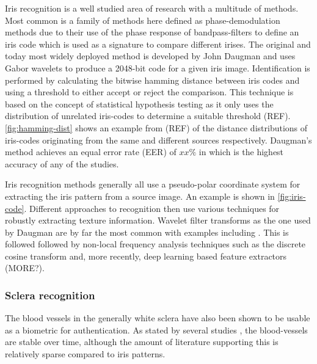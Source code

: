 Iris recognition is a well studied area of research with a multitude of methods. Most common is a family of methods here defined as phase-demodulation methods due to their use of the phase response of bandpass-filters to define an iris code which is used as a signature to compare different irises. The original and today most widely deployed method is developed by John Daugman and uses Gabor wavelets to produce a 2048-bit code for a given iris image\cite{daugmanHighConfidenceVisual1993}. Identification is performed by calculating the bitwise hamming distance between iris codes and using a threshold to either accept or reject the comparison. This technique is based on the concept of statistical hypothesis testing as it only uses the distribution of unrelated iris-codes to determine a suitable threshold (REF). \autoref{fig:hamming-dist} shows an example from (REF) of the distance distributions of iris-codes originating from the same and different sources respectively. Daugman's method achieves an equal error rate (EER) of $xx\%$ in \parencite{daugman2007new} which is the highest accuracy of any of the studies.

Iris recognition methods generally all use a pseudo-polar coordinate system for extracting the iris pattern from a source image. An example is shown in \autoref{fig:iris-code}. Different approaches to recognition then use various techniques for robustly extracting texture information. Wavelet filter transforms as the one used by Daugman are by far the most common with examples including \parencite{daugman2007new, ma2002iris, ma2004efficient, poursaberi2006iris, rydgren2004iris, zhu2000biometric}. This is followed followed by non-local frequency analysis techniques such as the discrete cosine transform \cite{iris-dct, monroDCTBasedIrisRecognition2007} and, more recently, deep learning based feature extractors\cite{gangwarDeepIrisNetDeepIris2016, nguyenIrisRecognitionOfftheShelf2018} (MORE?).

\subsubsection{Sclera recognition}
The blood vessels in the generally white sclera have also been shown to be usable as a biometric for authentication. As stated by several studies \cite{dasScleraRecognitionSurvey2013, zhouNewHumanIdentification2012}, the blood-vessels are stable over time, although the amount of literature supporting this is relatively sparse compared to iris patterns.

